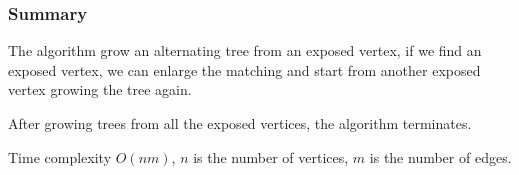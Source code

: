 \documentclass[hyperref={pdfpagelabels=false}]{beamer}
\begin{document}
%
%				
%				
%				
%				
%					
%				
%														

\frame
{
	\frametitle{Summary}
	The algorithm grow an alternating tree from an exposed vertex, if we find an exposed vertex, we can enlarge the matching and start from another exposed vertex growing the tree again. 
	
	\bigskip
	
	After growing trees from all the exposed vertices, the algorithm terminates.
	
	\bigskip
	
	Time complexity $O(nm)$, $n$ is the number of vertices, $m$ is the number of edges.
}
\end{document}
